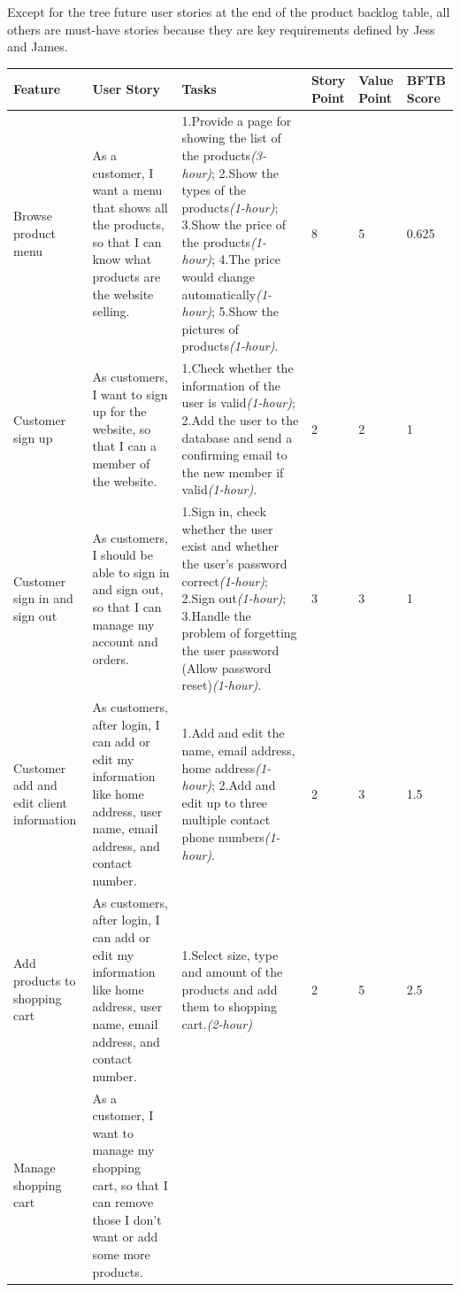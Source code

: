 \documentclass{report}
\begin{document}
Except for the tree future user stories at the end of the product backlog table, all others are must-have stories because they are key requirements defined by Jess and James.
\begin{tabularx}{0.95\linewidth}{%
  >{\raggedright\arraybackslash}p{1.5cm}%
  >{\raggedright\arraybackslash}X%
  >{\raggedright\arraybackslash}X%
  p{1cm}p{1cm}p{1cm}
  }
  \toprule
  Feature & User Story & Tasks & Story Point & Value Point & BFTB Score\\
  \midrule
  Browse product menu 
  & As a customer, I want a menu that shows all the products, so that I can know what products are the website selling. 
  & 1.Provide a page for showing the list of the products\textit{(3-hour)}; 2.Show the types of the products\textit{(1-hour)}; 3.Show the price of the products\textit{(1-hour)}; 4.The price would change automatically\textit{(1-hour)}; 5.Show the pictures of products\textit{(1-hour)}.
  & 8
  & 5
  & 0.625
  \\
  \midrule
  Customer sign up
  & As customers, I want to sign up for the website, so that I can a member of the website.
  & 1.Check whether the information of the user is valid\textit{(1-hour)}; 2.Add the user to the database and send a confirming email to the new member if valid\textit{(1-hour)}.
  & 2
  & 2
  & 1
  \\
  \midrule
  Customer sign in and sign out
  & As customers, I should be able to sign in and sign out, so that I can manage my account and orders.
  & 1.Sign in, check whether the user exist and whether the user's password correct\textit{(1-hour)}; 2.Sign out\textit{(1-hour)}; 3.Handle the problem of forgetting the user password (Allow password reset)\textit{(1-hour)}.
  & 3
  & 3
  & 1
  \\
  \midrule
  Customer add and edit client information
  & As customers, after login, I can add or edit my information like home address, user name, email address, and contact number.
  & 1.Add and edit the name, email address, home address\textit{(1-hour)}; 2.Add and edit up to three multiple contact phone numbers\textit{(1-hour)}.
  & 2
  & 3
  & 1.5
  \\
  \midrule
  Add products to shopping cart
  & As customers, after login, I can add or edit my information like home address, user name, email address, and contact number.
  & 1.Select size, type and amount of the products and add them to shopping cart.\textit{(2-hour)}
  & 2
  & 5
  & 2.5
  \\
  \midrule
  Manage shopping cart
  & As a customer, I want to manage my shopping cart, so that I can remove those I don't want or add some more products.

\end{tabularx}
\end{document}
